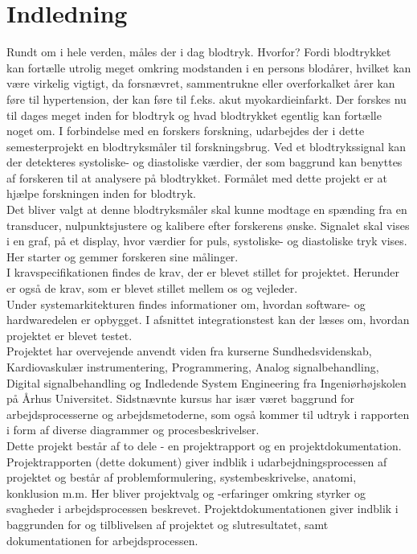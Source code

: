 \chapter{Indledning} 
Rundt om i hele verden, måles der i dag blodtryk. Hvorfor? Fordi blodtrykket kan fortælle utrolig meget omkring modstanden i en persons blodårer, hvilket kan være virkelig vigtigt, da forsnævret, sammentrukne eller overforkalket årer kan føre til hypertension, der kan føre til f.eks. akut myokardieinfarkt. Der forskes nu til dages meget inden for blodtryk og hvad blodtrykket egentlig kan fortælle noget om. I forbindelse med en forskers forskning, udarbejdes der i dette semesterprojekt en blodtryksmåler til forskningsbrug. Ved et blodtrykssignal kan der detekteres systoliske- og diastoliske værdier, der som baggrund kan benyttes af forskeren til at analysere på blodtrykket. Formålet med dette projekt er at hjælpe forskningen inden for blodtryk. \\
Det bliver valgt at denne blodtryksmåler skal kunne modtage en spænding fra en transducer, nulpunktsjustere og kalibere efter forskerens ønske. Signalet skal vises i en graf, på et display, hvor værdier for puls, systoliske- og diastoliske tryk vises. Her starter og gemmer forskeren sine målinger. \\
I kravspecifikationen findes de krav, der er blevet stillet for projektet. Herunder er også de krav, som er blevet stillet mellem os og vejleder. \\
Under systemarkitekturen findes informationer om, hvordan software- og hardwaredelen er opbygget.  I afsnittet integrationstest kan der læses om, hvordan projektet er blevet testet. \\
Projektet har overvejende anvendt viden fra kurserne Sundhedsvidenskab, Kardiovaskulær instrumentering, Programmering, Analog signalbehandling, Digital signalbehandling og Indledende System Engineering fra Ingeniørhøjskolen på Århus Universitet. Sidstnævnte kursus har især været baggrund for arbejdsprocesserne og arbejdsmetoderne, som også kommer til udtryk i rapporten i form af diverse diagrammer og procesbeskrivelser. \\
Dette projekt består af to dele - en projektrapport og en projektdokumentation. Projektrapporten (dette dokument) giver indblik i udarbejdningsprocessen af projektet og består af problemformulering, systembeskrivelse, anatomi, konklusion m.m. Her bliver projektvalg og -erfaringer omkring styrker og svagheder i arbejdsprocessen beskrevet. Projektdokumentationen giver indblik i baggrunden for og tilblivelsen af projektet og slutresultatet, samt dokumentationen for arbejdsprocessen. \\

